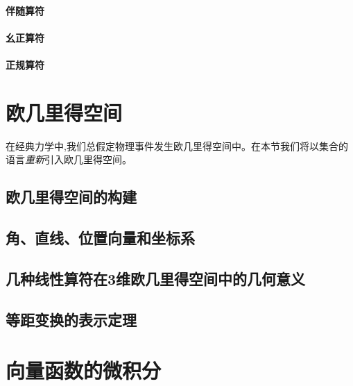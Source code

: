 \documentclass[zihao=-4,linespread=1.5,a4paper,heading=true,twoside]{ctexbook}
\theoremstyle{definition}
\theoremstyle{plain}
\begin{document}
\subsubsection{伴随算符}\label{sec:II.2.4.2_adjoint}

\subsubsection{幺正算符}\label{sec:II.2.4.2_unitary}

\subsubsection{正规算符}\label{sec:II.2.4.2_normal}




\chapter{欧几里得空间}\label{sec:II.3}
在经典力学中,我们总假定物理事件发生欧几里得空间中。在本节我们将以集合的语言\emph{重新}引入欧几里得空间。
\section{欧几里得空间的构建}\label{sec:II.3.1}


\section{角、直线、位置向量和坐标系}\label{sec:II.3.2}


\section{几种线性算符在3维欧几里得空间中的几何意义}\label{sec:II.3.3}


\section{等距变换的表示定理}\label{sec:II.3.4}


\chapter{向量函数的微积分}\label{sec:II.4}
\end{document}

